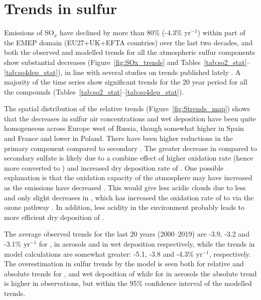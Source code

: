 

\section{\label{sec:Trends_sulfur}Trends in sulfur}

Emissions of SO$_x$ have declined by more than 80\% (-4.3\% yr$^{-1}$) within part of the EMEP domain (EU27+UK+EFTA countries) over the last two decades, and both the observed and modelled trends for all the atmospheric sulfur components show substantial decreases (Figure~\ref{fig:SOx_trends} and 
Tables~\ref{tab:so2_stat}--\ref{tab:so4dep_stat}), in line with several studies on trends published lately \citep{aas2019global,TFMM2016, Vivanco2018, Theobald2019, Colette2021, Banzhaf2015, torseth2012, Crippa2016}. A majority of the time series show significant trends for the 20 year period for all the compounds (Tables~\ref{tab:so2_stat}--\ref{tab:so4dep_stat}).


The spatial distribution of the relative trends (Figure~\ref{fig:Strends_map}) shows that the decreases in sulfur air concentrations and wet deposition have been quite homogeneous across Europe west of Russia, though somewhat higher in Spain and France and lower in Poland. There have been higher reductions in the primary component \soii compared to  secondary \soiv. The greater decrease in \soii compared to secondary sulfate is likely due to a combine effect of higher oxidation rate (hence more \soii converted to \soiv) and increased dry deposition rate of \soii. One possible explanation is that the oxidation capacity of the atmosphere may have increased as the emissions have decreased \citep{Dalsoren2016}. This would give less acidic clouds due to less \soii and only slight decreases in \nhiii, which has increased the oxidation rate of \soii to \soiv via the ozone pathway \citep{Banzhaf2015, Redington2009}. In addition, less acidity in the environment probably leads to more efficient dry deposition of \soii \citep{Fowler_et_al:2009}. 

The average observed trends for the last 20 years (2000--2019) are -3.9, -3.2 and -3.1\% yr$^{-1}$ for \soii, \soiv in aerosols and \soiv in wet deposition respectively, while the trends in model calculations are somewhat greater: -5.1, -3.8 and -4.3\% yr$^{-1}$, respectively. The overestimation in sulfur trends by the model is seen both for relative and absolute trends for \soii, and wet deposition of \soiv while for \soiv in aerosols the absolute trend is higher in observations, but within the 95\% confidence interval of the modelled trends.  

